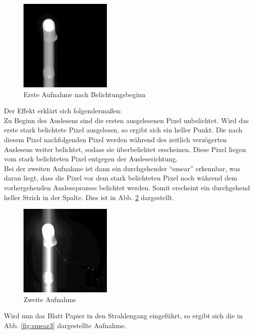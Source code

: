 \begin{figure}[h!]
\centering
        \includegraphics[width=.4\textwidth]{smear_unten_sebi.png}
\caption{ Erste Aufnahme nach Belichtungsbeginn }
\label{fig:smear1}
\end{figure}
Der Effekt erklärt sich folgendermaßen:\\
Zu Beginn des Auslesens sind die ersten ausgelesenen Pixel unbelichtet. Wird das erste stark belichtete Pixel ausgelesen, so ergibt sich ein heller Punkt. Die nach diesem Pixel nachfolgenden Pixel werden während des zeitlich verzögerten Auslesens weiter belichtet, sodass sie überbelichtet erscheinen. Diese Pixel liegen vom stark belichteten Pixel entgegen der Ausleserichtung. \\
Bei der zweiten Aufnahme ist dann ein durchgehender \enquote{smear} erkennbar, was daran liegt, dass die Pixel vor dem stark belichteten Pixel noch während dem vorhergehenden Ausleseprozess belichtet werden. Somit erscheint ein durchgehend heller Strich in der Spalte. Dies ist in Abb. \ref{fig:smear2} dargestellt. 

\begin{figure}[h!]
\centering
        \includegraphics[width=.4\textwidth]{smear.png}
\caption{ Zweite Aufnahme }
\label{fig:smear2}
\end{figure}

Wird nun das Blatt Papier in den Strahlengang eingeführt, so ergibt sich die in Abb. \ref{fig:smear3} dargestellte Aufnahme. 

